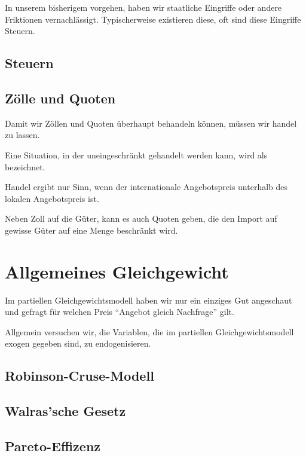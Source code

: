 In unserem bisherigem vorgehen, haben wir staatliche Eingriffe oder andere Friktionen vernachlässigt.
Typischerweise existieren diese, oft sind diese Eingriffe Steuern.

\subsection{Steuern}



\subsection{Zölle und Quoten}

Damit wir Zöllen und Quoten überhaupt behandeln können, müssen wir handel zu lassen.


\begin{definition} 
	Eine Situation, in der uneingeschränkt gehandelt werden kann, wird als
	 bezeichnet.
\end{definition}

Handel ergibt nur Sinn, wenn der internationale Angebotspreis unterhalb des lokalen Angebotspreis ist.


Neben Zoll auf die Güter, kann es auch Quoten geben, die den Import auf gewisse Güter auf eine Menge beschränkt wird.



\section{Allgemeines Gleichgewicht}
Im partiellen Gleichgewichtsmodell haben wir nur ein einziges Gut
angeschaut und gefragt für welchen Preis \enquote{Angebot gleich Nachfrage} gilt.

Allgemein versuchen wir, die Variablen, die im partiellen Gleichgewichtsmodell exogen gegeben sind,
zu endogenisieren.


\subsection{Robinson-Cruse-Modell}


\subsection{Walras'sche Gesetz}




\subsection{Pareto-Effizenz}


